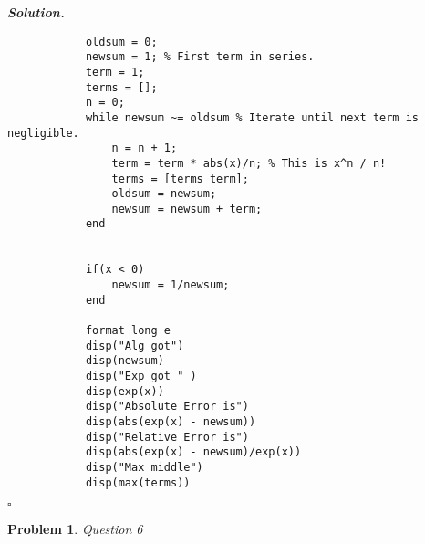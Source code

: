 \documentclass[12pt]{report}
\newtheorem{problem}{Problem}
\newenvironment{solution}[1][\it{Solution}]{\textbf{#1. } }{$\square$}
\begin{document}
\begin{solution}
\begin{enumerate}
\begin{verbatim}
            oldsum = 0;
            newsum = 1; % First term in series.
            term = 1;
            terms = [];
            n = 0;
            while newsum ~= oldsum % Iterate until next term is negligible.
                n = n + 1;
                term = term * abs(x)/n; % This is x^n / n!
                terms = [terms term];
                oldsum = newsum;
                newsum = newsum + term;
            end


            if(x < 0)
                newsum = 1/newsum;
            end

            format long e
            disp("Alg got")
            disp(newsum)
            disp("Exp got " )
            disp(exp(x))
            disp("Absolute Error is")
            disp(abs(exp(x) - newsum))
            disp("Relative Error is")
            disp(abs(exp(x) - newsum)/exp(x))
            disp("Max middle")
            disp(max(terms))
        \end{verbatim} 
    \end{enumerate}
\end{solution}

\newpage



\begin{problem}
    Question 6
\end{problem}
\end{document}
